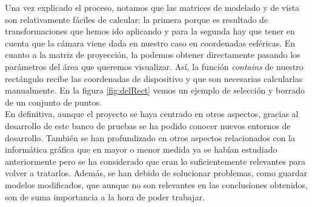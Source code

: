 Una vez explicado el proceso, notamos que las matrices de modelado y de vista son relativamente fáciles de calcular: la primera porque es resultado de transformaciones que hemos ido aplicando y para la segunda hay que tener en cuenta que la cámara viene dada en nuestro caso en coordenadas esféricas. En cuanto a la matriz de proyección, la podemos obtener directamente pasando los parámetros del área que queremos visualizar. Así, la función \textit{contains} de nuestro rectángulo recibe las coordenadas de dispositivo y que son necesarias calcularlas manualmente. En la figura \ref{fig:delRect} vemos un ejemplo de selección y borrado de un conjunto de puntos. \\

En definitiva, aunque el proyecto se haya centrado en otros aspectos, gracias al desarrollo de este banco de pruebas se ha podido conocer nuevos entornos de desarrollo. También se han profundizado en otros aspectos relacionados con la informática  gráfica que en mayor o menor medida ya se habían estudiado anteriormente pero se ha considerado que eran lo suficientemente relevantes para volver a tratarlos. Además, se han debido de solucionar problemas, como guardar modelos modificados, que aunque no son relevantes en las conclusiones obtenidos, son de suma importancia a la hora de poder trabajar.

\begin{comment}
\section{Instalación y uso}
La aplicación está pensada para poder ser ejecutaba en sistemas operativos \textit{Linux} ya que se ha desarrollado en \textit{Ubuntu}. No hace falta realizar ningún tipo de instalación para poder ejecutar la misma. En la documentación entregada se encuentra el archivo ejecutable denominado \textit{Application} dentro de la carpeta \textit{build-Application-Desktop\_Qt\_5\_9\_1\_GCC\_64bit-Debug}. En la carpeta \textit{Application} hay unos modelos de ejemplo de ejemplo en la carpeta \textit{Ejemplos} (\ref{table:1} y \ref{table:2}) y en \textit{ES} están los distintos archivos que hemos mencionado para pasar parámetros al programa. \\

Para mover la cámara se usan las flechas del teclado y para acercar y alejar la misma se usan las teclas menos y más respectivamente. Destacar que las combinaciones te teclado para modificar la matriz de vista son: \textit{CTRL+u} para mover arriba, \textit{CTRL+d} mover abajo, \textit{CTRL+l} mover a la izquierda y \textit{CTRL+r} mover a la derecha.
\end{comment}


